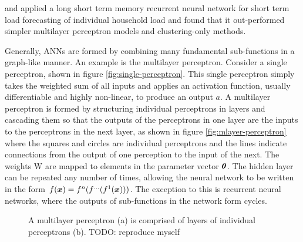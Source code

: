 \citet{Kong2017} and \citet{Kong2018} applied a long short term memory recurrent neural network for short term load forecasting of individual household load and found that it out-performed simpler multilayer perceptron models and clustering-only methods.
\par
Generally, ANNs are formed by combining many fundamental sub-functions in a graph-like manner. 
An example is the multilayer perceptron.
Consider a single perceptron, shown in figure \ref{fig:single-perceptron}.
This single perceptron simply takes the weighted sum of all inputs and applies an activation function, usually differentiable and highly non-linear, to produce an output $a$.
A multilayer perceptron is formed by structuring individual perceptrons in layers and cascading them so that the outputs of the perceptrons in one layer are the inputs to the perceptrons in the next layer, as shown in figure \ref{fig:mlayer-perceptron} where the squares and circles are individual perceptrons and the lines indicate connections from the output of one perception to the input of the next.
The weights W are mapped to elements in the parameter vector ${\bm{\theta}}$.
The hidden layer can be repeated any number of times, allowing the neural network to be written in the form $f({\bm{x}}) = f^n(f^{\ldots}(f^1({\bm{x}})))$.
The exception to this is recurrent neural networks, where the outputs of sub-functions in the network form cycles.
\begin{figure}[htbp]
	\centering
	\quad\quad
	\caption{A multilayer perceptron (a) is comprised of layers of individual perceptrons (b). TODO: reproduce myself}
	\label{fig:simple-ann}
\end{figure}

